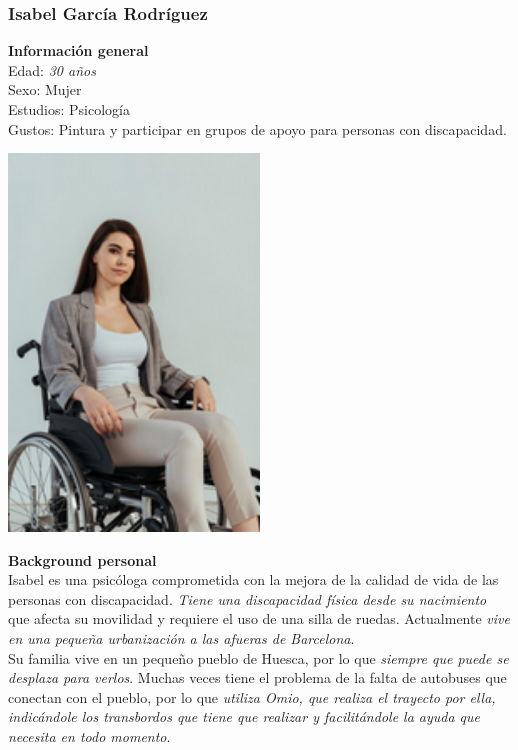 \subsubsection{Isabel García Rodríguez}
\begin{minipage}{0.4\textwidth}
    \textbf{Información general} \\

    Edad: \textit{30 años} \\
    Sexo: Mujer \\
    Estudios: Psicología \\
    Gustos: Pintura y participar en grupos de apoyo para personas con discapacidad. \\
\end{minipage}
\hfill
\begin{minipage}{0.4\textwidth}
    \centering
    \includegraphics[width=0.5\textwidth]{Imagenes/Personas/Isabel.png}
    \label{fig:fotoIsaP}
\end{minipage}

\textbf{Background personal} \\

Isabel es una psicóloga comprometida con la mejora de la calidad de vida de las personas con discapacidad. \textit{Tiene una 
discapacidad física desde su nacimiento} que afecta su movilidad y requiere el uso de una silla de ruedas. Actualmente
\textit{vive en una pequeña urbanización a las afueras de Barcelona}. \\

Su familia vive en un pequeño pueblo de Huesca, por lo que \textit{siempre que puede se desplaza para verlos}. Muchas veces 
tiene el problema de la falta de autobuses que conectan con el pueblo, por lo que \textit{utiliza Omio, que realiza el trayecto
por ella, indicándole los transbordos que tiene que realizar y facilitándole la ayuda que necesita en todo momento}. \\

